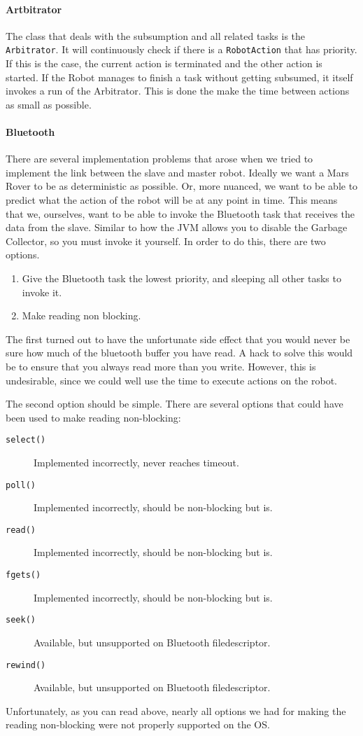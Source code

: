 \documentclass{scrartcl}
\begin{document}
\paragraph{Artbitrator}
The class that deals with the subsumption and all related tasks is the \texttt{Arbitrator}.
It will continuously check if there is a \texttt{RobotAction} that has priority.
If this is the case, the current action is terminated and the other action is started.
If the Robot manages to finish a task without getting subsumed, it itself invokes a run of the Arbitrator.
This is done the make the time between actions as small as possible.

\paragraph{Bluetooth}
There are several implementation problems that arose when we tried to implement the link between the slave and master robot.
Ideally we want a Mars Rover to be as deterministic as possible.
Or, more nuanced, we want to be able to predict what the action of the robot will be at any point in time.
This means that we, ourselves, want to be able to invoke the Bluetooth task that receives the data from the slave.
Similar to how the JVM allows you to disable the Garbage Collector, so you must invoke it yourself.
In order to do this, there are two options.
\begin{enumerate}
	\item Give the Bluetooth task the lowest priority, and sleeping all other tasks to invoke it.
	\item Make reading non blocking.
\end{enumerate}

The first turned out to have the unfortunate side effect that you would never be sure how much of the bluetooth buffer you have read.
A hack to solve this would be to ensure that you always read more than you write.
However, this is undesirable, since we could well use the time to execute actions on the robot.

The second option should be simple.
There are several options that could have been used to make reading non-blocking:
\begin{description}
	\item[\texttt{select()}] Implemented incorrectly, never reaches timeout.
	\item[\texttt{poll()}] Implemented incorrectly, should be non-blocking but is.
	\item[\texttt{read()}] Implemented incorrectly, should be non-blocking but is.
	\item[\texttt{fgets()}] Implemented incorrectly, should be non-blocking but is.
	\item[\texttt{seek()}] Available, but unsupported on Bluetooth filedescriptor.
	\item[\texttt{rewind()}] Available, but unsupported on Bluetooth filedescriptor.
\end{description}
Unfortunately, as you can read above, nearly all options we had for making the reading non-blocking were not properly supported on the OS.
\end{document}

